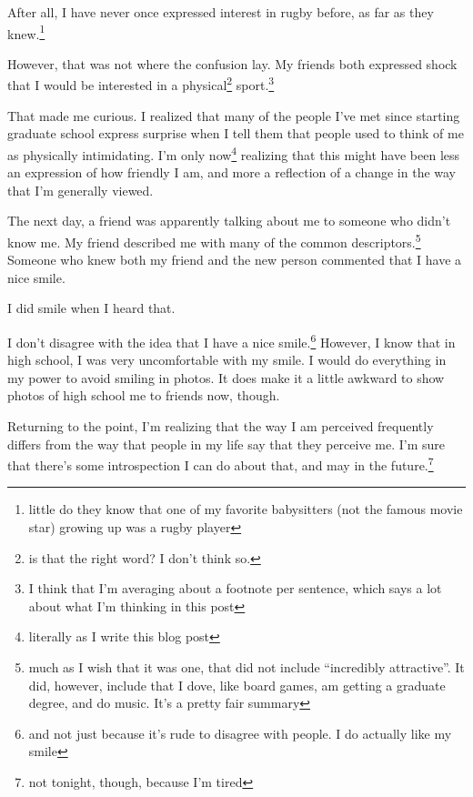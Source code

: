 \documentclass[12pt]{article}[titlepage]
\newcommand{\say}[1]{``#1''}
\renewcommand{\,}{\textsuperscript{,}}
\begin{document}
After all, I have never once expressed interest in rugby before, as far as they knew.\footnote{little do they know that one of my favorite babysitters (not the famous movie star) growing up was a rugby player}

However, that was not where the confusion lay.
My friends both expressed shock that I would be interested in a physical\footnote{is that the right word? I don't think so.} sport.\footnote{I think that I'm averaging about a footnote per sentence, which says a lot about what I'm thinking in this post}

That made me curious.
I realized that many of the people I've met since starting graduate school express surprise when I tell them that people used to think of me as physically intimidating.
I'm only now\footnote{literally as I write this blog post} realizing that this might have been less an expression of how friendly I am, and more a reflection of a change in the way that I'm generally viewed.

The next day, a friend was apparently talking about me to someone who didn't know me.
My friend described me with many of the common descriptors.\footnote{much as I wish that it was one, that did not include \say{incredibly attractive}. It did, however, include that I dove, like board games, am getting a graduate degree, and do music. It's a pretty fair summary}
Someone who knew both my friend and the new person commented that I have a nice smile.

I did smile when I heard that.

I don't disagree with the idea that I have a nice smile.\footnote{and not just because it's rude to disagree with people. I do actually like my smile}
However, I know that in high school, I was very uncomfortable with my smile.
I would do everything in my power to avoid smiling in photos.
It does make it a little awkward to show photos of high school me to friends now, though.

Returning to the point, I'm realizing that the way I am perceived frequently differs from the way that people in my life say that they perceive me.
I'm sure that there's some introspection I can do about that, and may in the future.\footnote{not tonight, though, because I'm tired}
\end{document}
